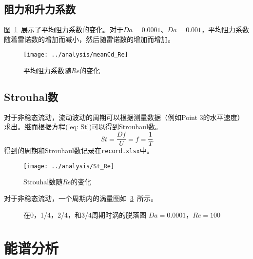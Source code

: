\subsection{阻力和升力系数}

图~\ref{fig: meanCd}~展示了平均阻力系数的变化。对于$Da=0.0001$、$Da=0.001$，平均阻力系数随着雷诺数的增加而减小，然后随雷诺数的增加而增加。

\begin{figure}[]
	\centering
	\texttt{[image: ../analysis/meanCd\_Re]}
	\caption{平均阻力系数随$Re$的变化}
	\label{fig: meanCd}
\end{figure}

\subsection{Strouhal数}

对于非稳态流动，流动波动的周期可以根据测量数据（例如Point 3的水平速度）求出。继而根据方程(\ref{eq: St})可以得到Strouhaul数。
\begin{equation}\label{eq: St}
	St = \frac{Df}{U} = f = \frac{1}{T}
\end{equation}
得到的周期和Strouhaul数记录在\texttt{record.xlsx}中。

\begin{figure}[]
	\centering
	\texttt{[image: ../analysis/St\_Re]}
	\caption{Strouhal数随$Re$的变化}
	\label{fig: St}
\end{figure}

对于非稳态流动，一个周期内的涡量图如~\ref{fig: 4*vortex}~所示。

\begin{figure}[]
	\centering
	\begin{minipage}{\textwidth}
		\centering
	\end{minipage}
	\centering
	\begin{minipage}{\textwidth}
		\centering
	\end{minipage}
	\caption{在0，1/4，2/4，和3/4周期时涡的脱落图 $Da=0.0001$，$Re=100$}
	\label{fig: 4*vortex}
\end{figure}

\section{能谱分析} %

